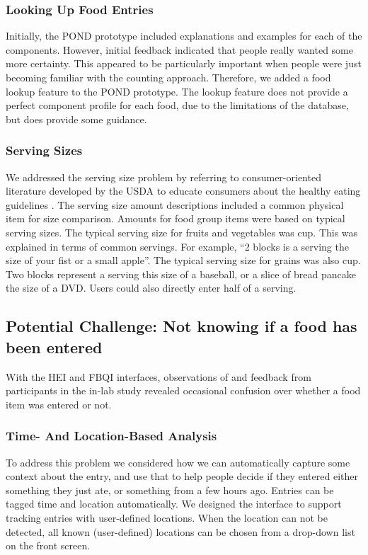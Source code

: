 \subsubsection{Looking Up Food Entries}
Initially, the POND prototype included explanations and examples for each of the components. However, initial feedback indicated that people really wanted some more certainty. This appeared to be particularly important when people were just becoming familiar with the counting approach. Therefore, we added a food lookup feature to the POND prototype. The lookup feature does not provide a perfect component profile for each food, due to the limitations of the database, but does provide some guidance. 


\subsubsection{Serving Sizes}
We addressed the serving size problem by referring to consumer-oriented literature developed by the USDA to educate consumers about the healthy eating guidelines \citep{usda_dietary_guidelines_2010}. The serving size amount descriptions included a common physical item for size comparison. Amounts for  food group items were based on typical serving sizes. The typical serving size for fruits and vegetables was \textonehalf cup. This was explained in terms of common servings. For example, ``2 blocks is a serving the size of your fist or a small apple''. The typical serving size for grains was also \textonehalf cup. Two blocks represent a serving this size of a baseball, or a slice of bread pancake the size of a DVD. Users could also directly enter half of a serving. 

\subsection{Potential Challenge: Not knowing if a food has been entered}

With the HEI and FBQI interfaces, observations of and feedback from participants in the in-lab study revealed occasional confusion over whether a food item was entered or not. 

\subsubsection{Time- And Location-Based Analysis}
To address this problem we considered how we can automatically capture some context about the entry, and use that to help people decide if they entered either something they just ate, or something from a few hours ago. Entries can be tagged time and location automatically. We designed the interface to support tracking entries with user-defined locations. When the location can not be detected, all known (user-defined) locations can be chosen from a drop-down list on the front screen. 

